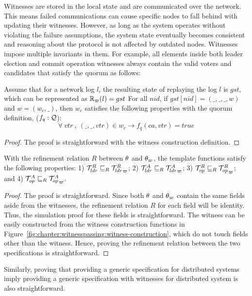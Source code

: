 

Witnesses are stored in the local state and are communicated over the network.
This means failed communications can
cause specific nodes to fall behind with updating their witnesses.
However, as long as the system operates without violating the failure 
assumptions, the system state eventually becomes consistent and reasoning 
about the protocol is not affected by outdated nodes.
Witnesses impose multiple invariants in them.
For example, all elements inside both leader election and commit operation witnesses 
always contain the valid voters and candidates that satisfy the quorum as follows:


\begin{theorem}\label{thm:witness-invariant}
Assume that for a network log $l$, the resulting state of replaying the log $l$ 
	is $gst$, which can be represented as $\mathbb{R}_\varpi(l) = gst$
For all $nid$, if $gst[nid] = (\_, \_, \_, w)$ and $w = (w_c, \_)$, then $w_c$ satisfies the following properties with the quorum definition, ($f_q : \mathcal{Q}$):
$$\forall\ vtr\ , \ ( \_, \_, vtr) \in w_c \rightarrow f_q(ca, vtr) = true$$
\end{theorem}

\begin{proof}
The proof is straightforward with the witness construction definition.
\end{proof}

\begin{theorem}\label{theorem:chapter:witnesspassing:spec-refine}
With the refinement relation $R$ between $\theta$ and $\theta_\varpi$, 
the template functions satisfy the following properties:
1) $\mathcal{T}^{R}_{ldr}  \sqsubseteq_{R} {\mathcal{T}^{R}_{ldr}}_{\varpi} $; 
2) $\mathcal{T}^{A}_{ldr}  \sqsubseteq_{R} {\mathcal{T}^{A}_{ldr}}_{\varpi} $; 
3) $\mathcal{T}^{R}_{op}  \sqsubseteq_{R} {\mathcal{T}^{R}_{op}}_{\varpi} $; and
4) $\mathcal{T}^{A}_{op}  \sqsubseteq_{R} {\mathcal{T}^{A}_{op}}_{\varpi}$.
\end{theorem}

\begin{proof}
The proof is straightforward. 
Since both $\theta$ and $\theta_\varpi$ contain the same fields aside from
the witnesses, the refinement relation $R$ for each field will be identity.
Thus, the simulation proof for these fields is straightforward. 
The witness can be easily constructed from the witness construction functions
in Figure~\ref{fig:chapter:witnesspassing:witness-construction}, which do not touch fields other
than the witness. 
Hence, proving the refinement relation between the two specifications is
straightforward.
\end{proof}

Similarly, proving that providing a generic specification for distributed
systems imply providing a generic specification with witnesses for distributed
system is also straightforward.



